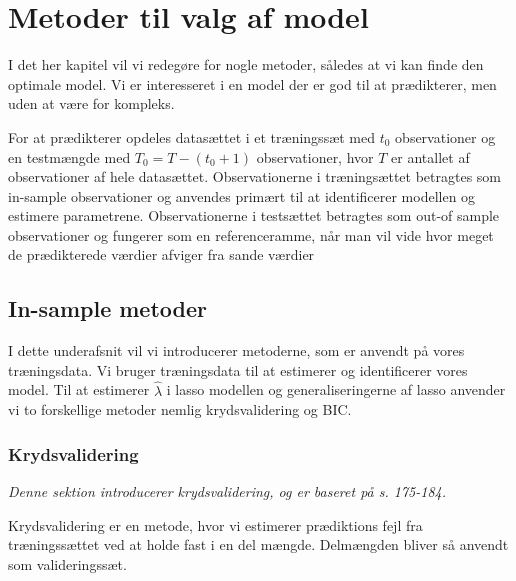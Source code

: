 \chapter{Metoder til valg af model}
I det her kapitel vil vi redegøre for nogle metoder, således at vi kan finde den optimale model.
Vi er interesseret i en model der er god til at prædikterer, men uden at være for kompleks.  

For at prædikterer opdeles datasættet i et træningssæt med $t_0$ observationer og en testmængde med $T_0 = T - (t_0 +1)$ observationer, hvor $T$ er antallet af observationer af hele datasættet. 
Observationerne i træningsættet betragtes som in-sample observationer og anvendes primært til at identificerer modellen og estimere parametrene. 
Observationerne i testsættet betragtes som out-of sample observationer og fungerer som en referenceramme, når man vil vide hvor meget de prædikterede værdier afviger fra sande værdier 
 
\section{In-sample metoder}
I dette underafsnit vil vi introducerer metoderne, som er anvendt på vores træningsdata. Vi bruger træningsdata til at estimerer og identificerer vores model. 
Til at estimerer $\widehat{\lambda}$ i lasso modellen og generaliseringerne af lasso anvender vi to forskellige metoder nemlig krydsvalidering og BIC. 

\subsection{Krydsvalidering}
\textit{Denne sektion introducerer krydsvalidering, og er baseret på \citep{james} s. 175-184. }

Krydsvalidering er en metode, hvor vi estimerer prædiktions fejl fra træningssættet ved at holde fast i en del mængde. Delmængden bliver så anvendt som valideringssæt. 

